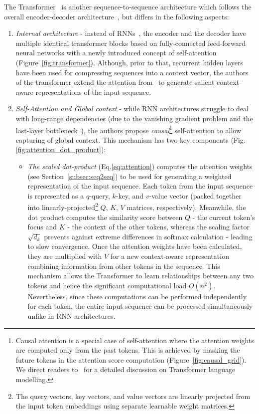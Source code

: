 The Transformer~\cite{vaswani2017attention} is another sequence-to-sequence architecture which follows the overall encoder-decoder architecture~\cite{sutskever2014sequence}, but differs in the following aspects:
\begin{enumerate}
    \item \emph{Internal architecture} - instead of RNNs~\cite{cho-etal-2014-learning}, the encoder and the decoder have multiple identical transformer blocks based on fully-connected feed-forward neural networks with a newly introduced concept of self-attention (Figure~\ref{fig:transformer}).
    Although, prior to that, recurrent hidden layers have been used for compressing sequences into a context vector, the authors of the transformer extend the attention from~\cite{bahdanau2016neural} to generate salient context-aware representations of the input sequence.
    \item \emph{Self-Attention and Global context} - while RNN architectures struggle to deal with long-range dependencies (due to the vanishing gradient problem and the last-layer bottleneck~\cite{bahdanau2016neural}), the authors propose
    \emph{causal}\footnote{
        Causal attention is a special case of self-attention where the attention weights are computed only from the past tokens.
        This is achieved by masking the future tokens in the attention score computation (Figure~\ref{fig:causal_grid}).
        We direct readers to~\cite{jurafsky2000} for a detailed discussion on Transformer language modelling.
    } self-attention to allow capturing of global context.
    This mechanism has two key components (Fig.\ref{fig:attention_dot_product}):
    \begin{itemize}
        \item \emph{The scaled dot-product} (Eq.\ref{eq:attention}) computes the attention weights (see Section~\ref{subsec:seq2seq}) to be used for generating a weighted representation of the input sequence.
        Each token from the input sequence is represented as a $q$-query, $k$-key, and $v$-value vector (packed together into linearly-projected\footnote{
            The query vectors, key vectors, and value vectors are linearly projected from the input token embeddings using separate learnable weight matrices.
        } $Q$, $K$, $V$ matrices, respectively).
        Meanwhile, the dot product computes the similarity score between $Q$ - the current token's focus and $K$ - the context of the other tokens, whereas the scaling factor $\sqrt{d_{k}}$ prevents against extreme differences in softmax calculation - leading to slow convergence.
        Once the attention weights have been calculated, they are multiplied with $V$ for a new context-aware representation combining information from other tokens in the sequence.
        This mechanism allows the Transformer to learn relationships between any two tokens and hence the significant computational load $O(n^2)$.
        Nevertheless, since these computations can be performed independently for each token, the entire input sequence can be processed simultaneously unlike in RNN architectures.


\end{itemize}
\end{enumerate}
